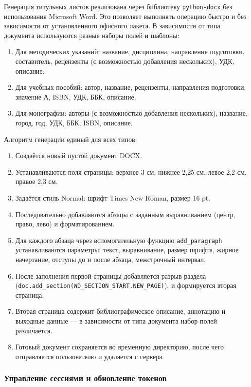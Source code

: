 Генерация титульных листов реализована через библиотеку \texttt{python-docx} без использования Microsoft Word. Это позволяет выполнять операцию быстро и без зависимости от установленного офисного пакета. В зависимости от типа документа используются разные наборы полей и шаблоны:

\begin{enumerate}
	\item Для методических указаний: название, дисциплина, направление подготовки, составитель, рецензенты (с возможностью добавления нескольких), УДК, описание.
	\item Для учебных пособий: автор, название, рецензенты, направления подготовки, значение А, ISBN, УДК, ББК, описание.
	\item Для монографии: авторы (с возможностью добавления нескольких), название, город, год, УДК, ББК, ISBN, описание.
\end{enumerate}

Алгоритм генерации единый для всех типов:

\begin{enumerate}
	\item Создаётся новый пустой документ DOCX.
	\item Устанавливаются поля страницы: верхнее 3 см, нижнее 2,25 см, левое 2,2 см, правое 2,3 см.
	\item Задаётся стиль Normal: шрифт Times New Roman, размер 16 pt.
	\item Последовательно добавляются абзацы с заданным выравниванием (центр, право, лево) и форматированием.
	\item Для каждого абзаца через вспомогательную функцию \texttt{add\_paragraph} устанавливаются параметры: текст, выравнивание, размер шрифта, жирное начертание, отступы до и после абзаца, межстрочный интервал.
	\item После заполнения первой страницы добавляется разрыв раздела (\texttt{doc.add\_section(WD\_SECTION\_START.NEW\_PAGE)}), и формируется вторая страница.
	\item Вторая страница содержит библиографическое описание, аннотацию и выходные данные — в зависимости от типа документа набор полей различается.
	\item Готовый документ сохраняется во временную директорию, после чего отправляется пользователю и удаляется с сервера.
\end{enumerate}

\subsubsection{Управление сессиями и обновление токенов}

